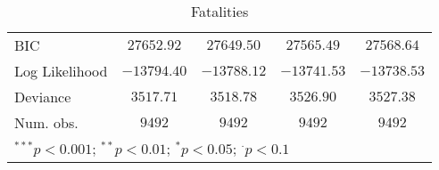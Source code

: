\begin{sidewaystable}
\begin{center}
{\begin{tabular}{l c c c c}
BIC             & $27652.92$    & $27649.50$    & $27565.49$    & $27568.64$    \\
Log Likelihood  & $-13794.40$   & $-13788.12$   & $-13741.53$   & $-13738.53$   \\
Deviance        & $3517.71$     & $3518.78$     & $3526.90$     & $3527.38$     \\
Num. obs.       & $9492$        & $9492$        & $9492$        & $9492$        \\
\hline
\multicolumn{5}{l}{\scriptsize{$^{***}p<0.001$; $^{**}p<0.01$; $^{*}p<0.05$; $^{\cdot}p<0.1$}}
\end{tabular}
}
\caption{Fatalities}
\label{statebaseddeaths}
\end{center}
\end{sidewaystable}
